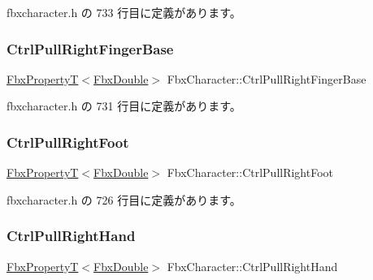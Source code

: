  fbxcharacter.\+h の 733 行目に定義があります。

\mbox{\label{class_fbx_character_abf8f8567058b002645e8584572139d8e}} 
\subsubsection{\texorpdfstring{Ctrl\+Pull\+Right\+Finger\+Base}{CtrlPullRightFingerBase}}
{\footnotesize\ttfamily \hyperlink{class_fbx_property_t}{Fbx\+PropertyT}$<$\hyperlink{fbxtypes_8h_a171e72a1c46fc15c1a6c9c31948c1c5b}{Fbx\+Double}$>$ Fbx\+Character\+::\+Ctrl\+Pull\+Right\+Finger\+Base}



 fbxcharacter.\+h の 731 行目に定義があります。

\mbox{\label{class_fbx_character_ac687c6519770d52f88efad6aa79fb174}} 
\subsubsection{\texorpdfstring{Ctrl\+Pull\+Right\+Foot}{CtrlPullRightFoot}}
{\footnotesize\ttfamily \hyperlink{class_fbx_property_t}{Fbx\+PropertyT}$<$\hyperlink{fbxtypes_8h_a171e72a1c46fc15c1a6c9c31948c1c5b}{Fbx\+Double}$>$ Fbx\+Character\+::\+Ctrl\+Pull\+Right\+Foot}



 fbxcharacter.\+h の 726 行目に定義があります。

\mbox{\label{class_fbx_character_a392d76b0a290f80f76f0aa9f7f513345}} 
\subsubsection{\texorpdfstring{Ctrl\+Pull\+Right\+Hand}{CtrlPullRightHand}}
{\footnotesize\ttfamily \hyperlink{class_fbx_property_t}{Fbx\+PropertyT}$<$\hyperlink{fbxtypes_8h_a171e72a1c46fc15c1a6c9c31948c1c5b}{Fbx\+Double}$>$ Fbx\+Character\+::\+Ctrl\+Pull\+Right\+Hand}



